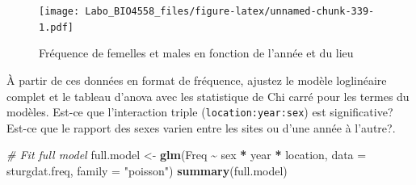\documentclass[
  12pt,
]{book}
\makeatletter
\newenvironment{Shaded}{\begin{snugshade}}{\end{snugshade}}
\newcommand{\CommentTok}[1]{\textcolor[rgb]{0.56,0.35,0.01}{\textit{#1}}}
\newcommand{\DataTypeTok}[1]{\textcolor[rgb]{0.13,0.29,0.53}{#1}}
\newcommand{\KeywordTok}[1]{\textcolor[rgb]{0.13,0.29,0.53}{\textbf{#1}}}
\newcommand{\NormalTok}[1]{#1}
\newcommand{\OperatorTok}[1]{\textcolor[rgb]{0.81,0.36,0.00}{\textbf{#1}}}
\newcommand{\StringTok}[1]{\textcolor[rgb]{0.31,0.60,0.02}{#1}}
\newenvironment{kframe}{%
\medskip{}
\setlength{\fboxsep}{.8em}
\def\at@end@of@kframe{}%
\ifinner\ifhmode%
 \def\at@end@of@kframe{\end{minipage}}%
 \begin{minipage}{\columnwidth}%
\fi\fi%
\def\FrameCommand##1{\hskip\@totalleftmargin \hskip-\fboxsep
\colorbox{incolor}{##1}\hskip-\fboxsep
    \hskip-\linewidth \hskip-\@totalleftmargin \hskip\columnwidth}%
\MakeFramed {\advance\hsize-\width
  \@totalleftmargin\z@ \linewidth\hsize
  \@setminipage}}%
{\par\unskip\endMakeFramed%
\at@end@of@kframe}
\newenvironment{rmdblock}[1]
 {
 \begin{itemize}
 \renewcommand{\labelitemi}{
   \raisebox{-.7\height}[0pt][0pt]{
     {\setkeys{Gin}{width=3em,keepaspectratio}\texttt{[image: images/\#1]}}
   }
 }
 \begin{kframe}
 \setlength{\fboxsep}{1em}
 \item
 }
 {
 \end{kframe}
 \end{itemize}
 }
\newenvironment{rmdcode}
  {\begin{rmdblock}{screen}}
  {\end{rmdblock}}
\makeatother
\begin{document}
\begin{figure}
\centering
\texttt{[image: Labo\_BIO4558\_files/figure-latex/unnamed-chunk-339-1.pdf]}
\caption{\label{fig:unnamed-chunk-339}Fréquence de femelles et males en fonction de l'année et du lieu}
\end{figure}

\begin{rmdcode}
À partir de ces données en format de fréquence, ajustez le modèle loglinéaire complet et le tableau d'anova avec les statistique de Chi carré pour les termes du modèles. Est-ce que l'interaction triple (\texttt{location:year:sex}) est significative? Est-ce que le rapport des sexes varien entre les sites ou d'une année à l'autre?.
\end{rmdcode}

\begin{Shaded}
\begin{Highlighting}[]
\CommentTok{\# Fit full model}
\NormalTok{full.model \textless{}{-}}\StringTok{ }\KeywordTok{glm}\NormalTok{(Freq }\OperatorTok{\textasciitilde{}}\StringTok{ }\NormalTok{sex }\OperatorTok{*}\StringTok{ }\NormalTok{year }\OperatorTok{*}\StringTok{ }\NormalTok{location, }\DataTypeTok{data =}\NormalTok{ sturgdat.freq, }\DataTypeTok{family =} \StringTok{"poisson"}\NormalTok{)}
\KeywordTok{summary}\NormalTok{(full.model)}
\end{Highlighting}
\end{Shaded}
\end{document}
